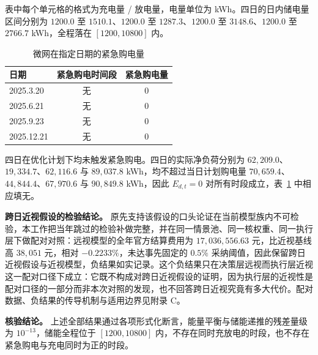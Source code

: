 表中每个单元格的格式为充电量 / 放电量，电量单位为 kWh。四日的日内储电量区间分别为 $1200.0$ 至 $1510.1$、$1200.0$ 至 $1287.3$、$1200.0$ 至 $3148.6$、$1200.0$ 至 $2766.7$ kWh，全程落在 $[1200,10800]$ 内。

\begin{table}[htbp]
\centering
\caption{微网在指定日期的紧急购电量}
\label{tab:emergency2}
\begin{tabular}{lcc}
\toprule
日期 & 紧急购电时间段 & 紧急购电量 \\
\midrule
2025.3.20 & 无 & 0 \\
2025.6.21 & 无 & 0 \\
2025.9.23 & 无 & 0 \\
2025.12.21 & 无 & 0 \\
\bottomrule
\end{tabular}
\end{table}

四日在优化计划下均未触发紧急购电。四日的实际净负荷分别为 $62{,}209.0$、$19{,}334.7$、$62{,}116.6$ 与 $89{,}037.8$ kWh，均不超过当日计划购电量 $70{,}659.4$、$44{,}844.4$、$67{,}970.6$ 与 $90{,}849.8$ kWh，因此 $E_{d,t}=0$ 对所有时段成立，表~\ref{tab:emergency2} 中相应填无。

\textbf{跨日近视假设的检验结论。} 原先支持该假设的口头论证在当前模型族内不可检验，本工作把当年跳过的检验补做完整，并在同一情景池、同一核权重、同一执行层下做配对对照：远视模型的全年官方结算费用为 $17{,}036{,}556.63$ 元，比近视基线高 $38{,}051$ 元，相对 $-0.2233\%$，未达事先固定的 $0.5\%$ 采纳阈值，因此保留跨日近视假设与近视模型，负结果如实记录。这个负结果只在决策层远视而执行层近视这一配对口径下成立：它既不构成对跨日近视假设的证明，因为执行层的近视性是配对口径的一部分而非本次对照的发现，也不回答跨日近视究竟有多大代价。配对数据、负结果的传导机制与适用边界见附录 C。

\textbf{核验结论。} 上述全部结果通过各项形式化断言，能量平衡与储能递推的残差量级为 $10^{-13}$，储能全程位于 $[1200,10800]$ 内，不存在同时充放电的时段，也不存在紧急购电与充电同时为正的时段。

